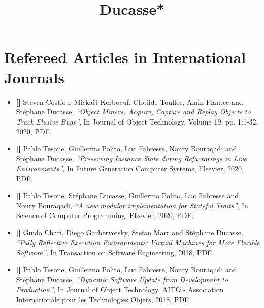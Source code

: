 \documentclass{article}
\title{{\bf *Ducasse*}\\[0.5cm]
{\bf }}
\author{}
\newcommand{\czauthors}[1]{#1}
\newcommand{\cztitle}[1]{\emph{``#1''}}
\newcommand{\czjournal}[1]{#1}
\begin{document}
\maketitle
{}
\newcommand{\pub}[0]
	{\stepcounter{publi}
	\item[\bf{[\arabic{publi}]}]}
	
	
\section{Refereed Articles in International Journals}

\begin{itemize}

	\pub  \czauthors{Steven Costiou, Micka\"{e}l Kerboeuf, Clotilde Toullec, Alain Plantec and St\'ephane Ducasse},  \cztitle{Object Miners: Acquire, Capture and Replay Objects to Track Elusive Bugs},  In \czjournal{Journal of Object Technology}, Volume 19, pp. 1:1-32, 2020, \href{http://rmod-files.lille.inria.fr/Team/Texts/Papers/Cost20b-JOT-ObjectMiners.pdf}{PDF}.

	\pub  \czauthors{Pablo Tesone, Guillermo Polito, Luc Fabresse, Noury Bouraqadi and St\'ephane Ducasse},  \cztitle{Preserving Instance State during Refactorings in Live Environments},  In \czjournal{Future Generation Computer Systems}, Elsevier, 2020, \href{http://rmod-files.lille.inria.fr/Team/Texts/Papers/Teso20a-FutureGeneration-PreservingInstance.pdf}{PDF}.

	\pub  \czauthors{Pablo Tesone, St\'ephane Ducasse, Guillermo Polito, Luc Fabresse and Noury Bouraqadi},  \cztitle{A new modular implementation for Stateful Traits},  In \czjournal{Science of Computer Programming}, Elsevier, 2020, \href{http://rmod-files.lille.inria.fr/Team/Texts/Papers/Teso20b-SCP-StatefulTraits.pdf}{PDF}.

	\pub  \czauthors{Guido Chari, Diego Garbervetsky, Stefan Marr and St\'ephane Ducasse},  \cztitle{Fully Reflective Execution Environments: Virtual Machines for More Flexible Software},  In \czjournal{Transaction on Software Engineering}, 2018, \href{http://rmod-files.lille.inria.fr/Team/Texts/Papers/Char18a-preprint-TSE-ReflectiveExecutionEnvironments.pdf}{PDF}.

	\pub  \czauthors{Pablo Tesone, Guillermo Polito, Luc Fabresse, Noury Bouraqadi and St\'ephane Ducasse},  \cztitle{Dynamic Software Update from Development to Production},  In \czjournal{Journal of Object Technology}, AITO - Association Internationale pour les Technologies Objets, 2018, \href{http://rmod-files.lille.inria.fr/Team/Texts/Papers/Teso17b-JOT-DynamicUpdate.pdf}{PDF}.


\end{itemize}
\end{document}
